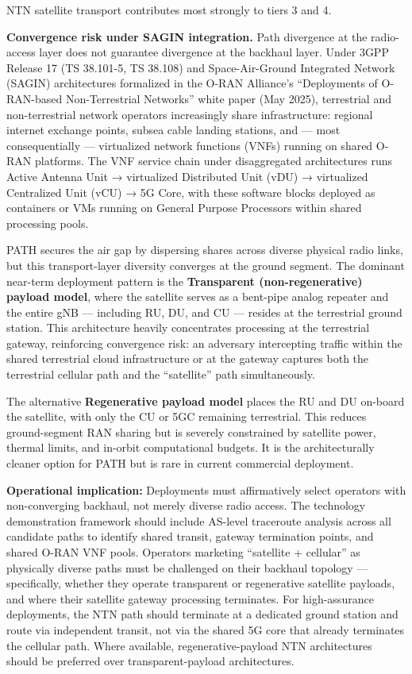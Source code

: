 \documentclass[
  11pt,
]{article}
\begin{document}
NTN satellite transport contributes most strongly to tiers 3 and 4.

\textbf{Convergence risk under SAGIN integration.} Path divergence at
the radio-access layer does not guarantee divergence at the backhaul
layer. Under 3GPP Release 17 (TS 38.101-5, TS 38.108) and
Space-Air-Ground Integrated Network (SAGIN) architectures formalized in
the O-RAN Alliance's ``Deployments of O-RAN-based Non-Terrestrial
Networks'' white paper (May 2025), terrestrial and non-terrestrial
network operators increasingly share infrastructure: regional internet
exchange points, subsea cable landing stations, and --- most
consequentially --- virtualized network functions (VNFs) running on
shared O-RAN platforms. The VNF service chain under disaggregated
architectures runs Active Antenna Unit → virtualized Distributed Unit
(vDU) → virtualized Centralized Unit (vCU) → 5G Core, with these
software blocks deployed as containers or VMs running on General Purpose
Processors within shared processing pools.

PATH secures the air gap by dispersing shares across diverse physical
radio links, but this transport-layer diversity converges at the ground
segment. The dominant near-term deployment pattern is the
\textbf{Transparent (non-regenerative) payload model}, where the
satellite serves as a bent-pipe analog repeater and the entire gNB ---
including RU, DU, and CU --- resides at the terrestrial ground station.
This architecture heavily concentrates processing at the terrestrial
gateway, reinforcing convergence risk: an adversary intercepting traffic
within the shared terrestrial cloud infrastructure or at the gateway
captures both the terrestrial cellular path and the ``satellite'' path
simultaneously.

The alternative \textbf{Regenerative payload model} places the RU and DU
on-board the satellite, with only the CU or 5GC remaining terrestrial.
This reduces ground-segment RAN sharing but is severely constrained by
satellite power, thermal limits, and in-orbit computational budgets. It
is the architecturally cleaner option for PATH but is rare in current
commercial deployment.

\textbf{Operational implication:} Deployments must affirmatively select
operators with non-converging backhaul, not merely diverse radio access.
The technology demonstration framework should include AS-level
traceroute analysis across all candidate paths to identify shared
transit, gateway termination points, and shared O-RAN VNF pools.
Operators marketing ``satellite + cellular'' as physically diverse paths
must be challenged on their backhaul topology --- specifically, whether
they operate transparent or regenerative satellite payloads, and where
their satellite gateway processing terminates. For high-assurance
deployments, the NTN path should terminate at a dedicated ground station
and route via independent transit, not via the shared 5G core that
already terminates the cellular path. Where available,
regenerative-payload NTN architectures should be preferred over
transparent-payload architectures.
\end{document}
